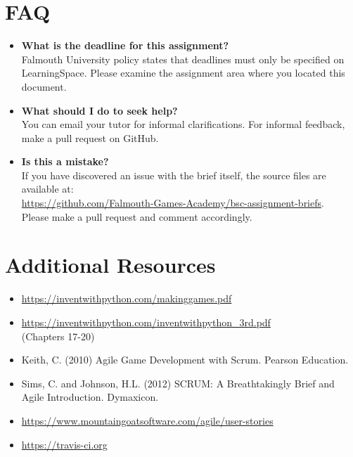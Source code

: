 \documentclass{../fal_assignment}
\begin{document}
\section*{FAQ}

\begin{itemize}
	\item 	\textbf{What is the deadline for this assignment?} \\ 
    		Falmouth University policy states that deadlines must only be specified on LearningSpace. Please examine the assignment area where you located this document.
    		
	\item 	\textbf{What should I do to seek help?} \\ 
    		You can email your tutor for informal clarifications. For informal feedback, make a pull request on GitHub. 
    		
    	\item 	\textbf{Is this a mistake?} \\ 	
    		If you have discovered an issue with the brief itself, the source files are available at: \\
    		\url{https://github.com/Falmouth-Games-Academy/bsc-assignment-briefs}.\\
    		 Please make a pull request and comment accordingly.
\end{itemize}

\section*{Additional Resources}

\begin{itemize}
    \item \url{https://inventwithpython.com/makinggames.pdf}
    \item \url{https://inventwithpython.com/inventwithpython_3rd.pdf} \\ (Chapters 17-20)
    \item Keith, C. (2010) Agile Game Development with Scrum. Pearson Education.
    \item Sims, C. and Johnson, H.L. (2012) SCRUM: A Breathtakingly Brief and Agile Introduction. Dymaxicon.
    \item \url{https://www.mountaingoatsoftware.com/agile/user-stories}
    \item \url{https://travis-ci.org}
\end{itemize}
\end{document}
